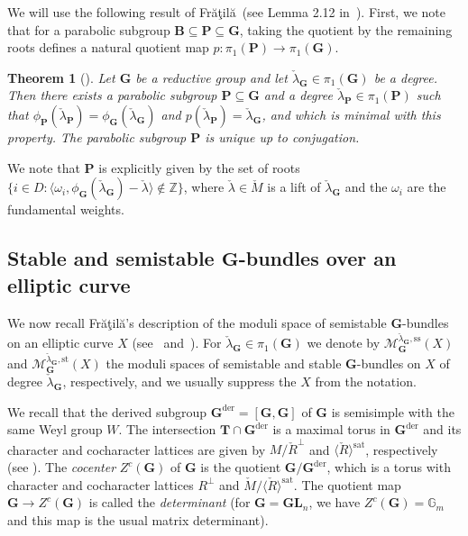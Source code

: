 \documentclass[10pt, a4paper]{amsart}
\newtheorem{theorem}{Theorem}[section]
\theoremstyle{definition}
\theoremstyle{myitemstyle}
\newcommand{\Z}{\mathbb{Z}}
\newcommand{\G}{\mathbb{G}}
\newcommand{\Mcheck}{{\check{M}}}
\newcommand{\lambdacheck}{\check{\lambda}}
\newcommand{\Rcheck}{\check{R}}
\newcommand{\bfG}{\mathbf{G}}
\newcommand{\bfT}{\mathbf{T}}
\newcommand{\bfP}{\mathbf{P}}
\newcommand{\bfB}{\mathbf{B}}
\newcommand{\bGL}{\mathbf{GL}}
\newcommand{\mc}[1]{{\mathcal{#1}}}
\newcommand{\st}{\mathrm{st}}
\newcommand{\sat}{\mathrm{sat}}
\newcommand{\semist}{\mathrm{ss}}
\newcommand{\Fratila}{Fr{\u{a}}{\c{t}}il{\u{a}}}
\begin{document}
We will use the following result of \Fratila~(see Lemma 2.12 in~\cite{fratila2016stack}). First, we note that for a parabolic subgroup $\bfB\subseteq \bfP\subseteq \bfG$, taking the quotient by the remaining roots defines a natural quotient map $p:\pi_1(\bfP)\to \pi_1(\bfG)$. 


\begin{theorem}[{\cite[Lemma 2.12]{fratila2016stack}}]
\label{thm:Fratila existence of minimal parabolic}
Let $\bfG$ be a reductive group and let $\lambdacheck_\bfG\in\pi_1(\bfG)$ be a degree. Then there exists a parabolic subgroup $\bfP\subseteq \bfG$ and a degree $\lambdacheck_\bfP\in \pi_1(\bfP)$ such that $\phi_\bfP(\lambdacheck_\bfP)=\phi_\bfG(\lambdacheck_\bfG)$ and $p(\lambdacheck_\bfP)=\lambdacheck_\bfG$, and which is minimal with this property. The parabolic subgroup $\bfP$ is unique up to conjugation.

\end{theorem}

We note that $\bfP$ is explicitly given by the set of roots $\{i \in D : \langle \omega_i ,\phi_\bfG(\lambdacheck_\bfG) - \lambdacheck \rangle \notin \Z \} $, where $\lambdacheck \in \Mcheck$ is a lift of $\lambdacheck_\bfG$ and the $\omega_i$ are the fundamental weights.



\subsection{Stable and semistable $\bfG$-bundles over an elliptic curve} 
\label{subsec:stability for bundles on elliptic curves}

We now recall \Fratila's description of the moduli space of semistable $\bfG$-bundles on an elliptic curve $X$ (see~\cite{fratila2016stack} and~\cite{Fratila_revisitingelliptic}). For $\lambdacheck_\bfG\in \pi_1(\bfG)$ we denote by $\mc M_\bfG^{\lambdacheck_\bfG, \semist}(X)$ and $\mc M_\bfG^{\lambdacheck_\bfG,\st}(X)$ the moduli spaces of semistable and stable $\bfG$-bundles on $X$ of degree $\lambdacheck_\bfG$, respectively, and we usually suppress the $X$ from the notation.

We recall that the derived subgroup $\bfG^{\mathrm{der}}=[\bfG,\bfG]$ of $\bfG$ is semisimple with the same Weyl group $W$. The intersection $\bfT\cap \bfG^{\mathrm{der}}$ is a maximal torus in $\bfG^{\mathrm{der}}$ and its character and cocharacter lattices are given by $M /\Rcheck^\perp$ and $\langle \Rcheck\rangle^\sat$, respectively (see \cite[Corollary 8.1.9]{Springer_linalggroups}). The \emph{cocenter} $Z^c(\bfG)$ of $\bfG$ is the quotient $\bfG/\bfG^{\mathrm{der}}$, which is a torus with character and cocharacter lattices $R^\perp$ and $\Mcheck/\langle \Rcheck\rangle^\sat$. The quotient map $\bfG\to Z^c(\bfG)$ is called the \emph{determinant} (for $\bfG=\bGL_n$, we have $Z^c(\bfG)=\G_m$ and this map is the usual matrix determinant). 
\end{document}
